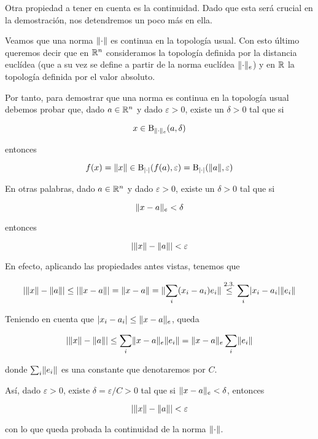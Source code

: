 Otra propiedad a tener en cuenta es la continuidad. Dado que esta será crucial en la demostración, nos detendremos un poco más en ella.


Veamos que una norma $\lVert\cdot\rVert$ es continua en la topología usual. Con esto último queremos decir que en $\mathbb{R}^n$ consideramos la topología definida por la distancia euclídea (que a su vez se define a partir de la norma euclídea $\lVert\cdot\rVert_e$) y en $\mathbb{R}$ la topología definida por el valor absoluto.


Por tanto, para demostrar que una norma es continua en la topología usual debemos probar que, dado $a\in\mathbb{R}^n$ y dado $\varepsilon>0$, existe un $\delta>0$ tal que si 

\[x\in \operatorname{B}_{\lVert\cdot\rVert_e}(a,\delta)\]

entonces

\[f(x)=\lVert x\rVert\in \operatorname{B}_{\lvert\cdot\rvert}(f(a),\varepsilon)=\operatorname{B}_{\lvert\cdot\rvert}(\lVert a\rVert,\varepsilon)\]

En otras palabras, dado $a\in\mathbb{R}^n$ y dado $\varepsilon>0$, existe un $\delta>0$ tal que si

\[\lVert x-a\rVert_e<\delta\]

entonces

\[\lvert\lVert x\rVert-\lVert a\rVert\rvert<\varepsilon\]


En efecto, aplicando las propiedades antes vistas, tenemos que

\begin{equation*}
\lvert\lVert x\rVert-\lVert a\rVert\rvert\le \lvert\lVert x-a\rVert\rvert=\lVert x-a\rVert=\lVert\sum_i(x_i-a_i)e_i\rVert\stackrel{2.3.}{\le}\sum_i\lvert x_i-a_i\rvert\lVert e_i\rVert
\end{equation*}

Teniendo en cuenta que $\lvert x_i-a_i\rvert\le \lVert x-a\rVert_e$, queda

\begin{equation*}
\lvert\lVert x\rVert-\lVert a\rVert\rvert\le \sum_i\lVert x-a\rVert_e\lVert e_i\rVert=\lVert x-a\rVert_e\sum_i\lVert e_i\rVert
\end{equation*}

donde $\sum_i\lVert e_i\rVert$ es una constante que denotaremos por $C$.


Así, dado $\varepsilon>0$, existe $\delta=\varepsilon/C>0$ tal que si $\lVert x-a\rVert_e<\delta$, entonces

\begin{equation*}
\lvert\lVert x\rVert-\lVert a\rVert\rvert<\varepsilon
\end{equation*}

con lo que queda probada la continuidad de la norma $\lVert\cdot\rVert$.\\



